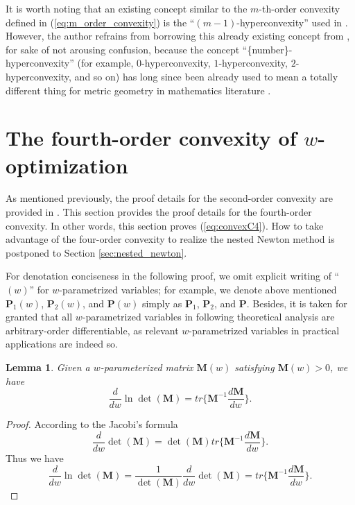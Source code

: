 \documentclass[12pt]{article}
\newtheorem{lemma}{Lemma}
\begin{document}
It is worth noting that an existing concept similar to the $m$-th-order convexity defined in (\ref{eq:m_order_convexity}) is the ``$(m-1)$-hyperconvexity'' used in \cite{Vatsala2006}. However, the author refrains from borrowing this already existing concept from \cite{Vatsala2006}, for sake of not arousing confusion, because the concept ``\{number\}-hyperconvexity'' (for example, $0$-hyperconvexity, $1$-hyperconvexity, $2$-hyperconvexity, and so on) has long since been already used to mean a totally different thing for metric geometry in mathematics literature \cite{Aronszajn1956, Rabier1985}.

\section{The fourth-order convexity of $w$-optimization} \label{sec:fourth_order_convexity}

As mentioned previously, the proof details for the second-order convexity are provided in \cite{Li2022FARET_2, Li2022FARET_1}. This section provides the proof details for the fourth-order convexity. In other words, this section proves (\ref{eq:convexC4}). How to take advantage of the four-order convexity to realize the nested Newton method is postponed to Section \ref{sec:nested_newton}.

For denotation conciseness in the following proof, we omit explicit writing of ``$(w)$'' for $w$-parametrized variables; for example, we denote above mentioned $\mathbf{P}_{1}(w)$, $\mathbf{P}_{2}(w)$, and $\mathbf{P}(w)$ simply as $\mathbf{P}_{1}$, $\mathbf{P}_{2}$, and $\mathbf{P}$. Besides, it is taken for granted that all $w$-parametrized variables in following theoretical analysis are arbitrary-order differentiable, as relevant $w$-parametrized variables in practical applications are indeed so.

\begin{lemma} \label{lm:diff1}
Given a $w$-parameterized matrix $\mathbf{M}(w)$ satisfying $\mathbf{M}(w)>0$, we have
\begin{equation*}
\frac{d}{dw} \ln \det(\mathbf{M}) = tr\{\mathbf{M}^{-1} \frac{d \mathbf{M}}{dw} \}.
\end{equation*}
\end{lemma}
\begin{proof}
According to the Jacobi's formula \cite{Horn1991}
\begin{equation*}
\frac{d}{dw} \det(\mathbf{M}) = \det(\mathbf{M}) tr\{\mathbf{M}^{-1} \frac{d \mathbf{M}}{dw} \}.
\end{equation*}
Thus we have
\begin{equation*}
\frac{d}{dw} \ln \det(\mathbf{M}) = \frac{1}{\det(\mathbf{M})} \frac{d}{dw} \det(\mathbf{M}) = tr\{\mathbf{M}^{-1} \frac{d \mathbf{M}}{dw} \}.
\end{equation*}
\end{proof}
\end{document}
